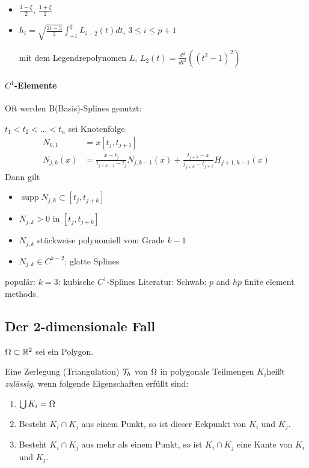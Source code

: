 \begin{itemize}
\item $\frac{1- \xi} 2$, $\frac{1+ \xi} 2$
\item $h_i = \sqrt{\frac{2i-3} 2} \int_{-1}^\xi L_{i-2}(t)dt$, $3 \leq i \leq p+1$

mit dem Legendrepolynomen $L$, $L_2 (t) = \frac{d^2}{dt^2}\left((t^2-1)^2\right)$ 
\end{itemize}

\paragraph{$C^1$-Elemente} Oft werden B(Basis)-Splines genutzt:

$t_1<t_2< \dots < t_n$ sei Knotenfolge.
\begin{align*}
  N_{0,1} &= x\left[ t_j, t_{j+1}\right] \\
N_{j,k} (x) &= \frac{x-t_j}{t_{j+k-1}-t_j} N_{j, k-1}(x) + \frac{t_{j+k}-x}{j_{j+k}-t_{j+1}}H_{j+1, k-1}(x) 
\end{align*}
Dann gilt
\begin{itemize}
\item $\operatorname{supp} N_{j,k} \subset [t_j, t_{j+k}]$
\item $N_{j,k}> 0$ in $[t_j, t_{j+k}]$
\item $N_{j,k}$ stückweise polynomiell vom Grade $k-1$
\item $N_{j,k} \in C^{k-2}$: glatte Splines 
\end{itemize}
populär: $k = 3$: kubische $C^1$-Splines
Literatur: Schwab: $p$ and $hp$ finite element methods.
\subsection{Der 2-dimensionale Fall}
$\Omega \subset \mathbb{R}^2$ sei ein Polygon.

\begin{definition}
  Eine Zerlegung (Triangulation) ${\cal T}_h$ von $\Omega$ in polygonale Teilmengen $K_i$heißt \emph{zulässig}, wenn folgende Eigenschaften erfüllt sind:
  \begin{enumerate}
  \item $\bigcup K_i = \Omega$
  \item Besteht $K_i \cap K_j$ aus einem Punkt, so ist dieser Eckpunkt von $K_i$ und $K_j$.
  \item Besteht $K_i \cap K_j$ aus mehr als einem Punkt, so ist $K_i \cap K_j$ eine Kante von $K_i$ und $K_j$. 
  \end{enumerate}
\end{definition}

